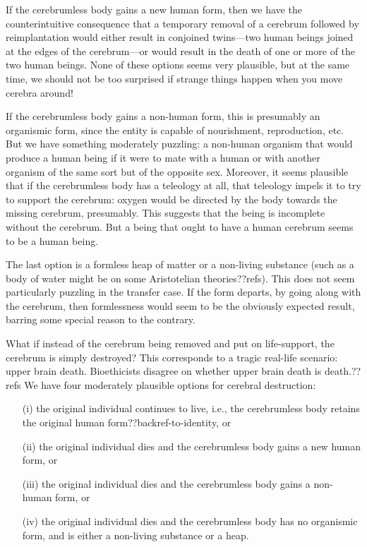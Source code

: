 If the cerebrumless body gains a new human form, then we have the counterintuitive consequence that a temporary removal
of a cerebrum followed by reimplantation would either result in conjoined twins---two human beings joined at the edges
of the cerebrum---or would result in the death of one or more of the two human beings. None of these options seems very
plausible, but at the same time, we should not be too surprised if strange things happen when you move cerebra around!

If the cerebrumless body gains a non-human form, this is presumably an organismic form, since the entity is capable of
nourishment, reproduction, etc. But we have something moderately puzzling: a non-human organism
that would produce a human being if it were to mate with a human or with another organism of the same sort but of the
opposite sex. Moreover, it seems plausible that if the cerebrumless body has a teleology at all, that teleology impels
it to try to support the cerebrum: oxygen would be directed by the body towards the missing cerebrum, presumably. This
suggests that the being is incomplete without the cerebrum. But a being that ought to have a human cerebrum seems to be 
a human being. 

The last option is a formless heap of matter or a non-living substance (such as a body of water might be on some 
Aristotelian theories??refs). This does not 
seem particularly puzzling in the transfer case. 
If the form departs, by going along with the cerebrum, then formlessness would seem to be the obviously expected result, 
barring some special reason to the contrary.

What if instead of the cerebrum being removed and put on life-support, the cerebrum is simply destroyed? This corresponds
to a tragic real-life scenario: upper brain death. Bioethicists disagree on whether upper brain death is death.??refs
We have four moderately plausible options for cerebral destruction:
\begin{itemize}
\item[(i)] the original individual continues to live, i.e., the cerebrumless body retains the original human form??backref-to-identity, or
\item[(ii)] the original individual dies and the cerebrumless body gains a new human form, or
\item[(iii)] the original individual dies and the cerebrumless body gains a non-human form, or
\item[(iv)] the original individual dies and the cerebrumless body has no organismic form, and is either a non-living substance or a heap.
\end{itemize}

